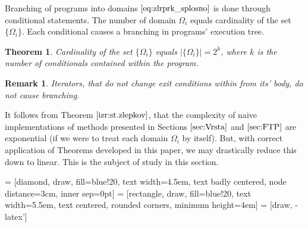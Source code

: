 \documentclass{article}
\newtheorem{izrek}{Theorem}[section]
\newtheorem{opomba}{Remark}[section]
\begin{document}
Branching of programs into domains $\eqref{eq:zlrprk_splosno}$ is done through conditional statements. The number of domain $\Omega_i$ equals cardinality of the set $\{\Omega_i\}$. Each conditional causes a branching in programs' execution tree.

\begin{izrek}\label{izr:st.zlepkov}
Cardinality of the set $\{\Omega_i\}$ equals $\lvert\{\Omega_i \}\rvert=2^k$, where $k$ is the number of conditionals contained within the program.
\end{izrek}
\begin{opomba}
Iterators, that do not change exit conditions within from its' body, do not cause branching.
\end{opomba}

It follows from Theorem $\ref{izr:st.zlepkov}$, that the complexity of naive implementations of methods presented in Sections $\ref{sec:Vrsta}$ and $\ref{sec:FTP}$ are exponential (if we were to treat each domain $\Omega_i$ by itself). But, with correct application of Theorems developed in this paper, we may drastically reduce this down to linear. This is the subject of study in this section.
\vspace{10px}

 = [diamond, draw, fill=blue!20, 
    text width=4.5em, text badly centered, node distance=3cm, inner sep=0pt]
 = [rectangle, draw, fill=blue!20, 
    text width=5.5em, text centered, rounded corners, minimum height=4em]
 = [draw, -latex']
\end{document}
